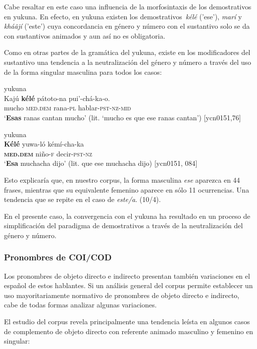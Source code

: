 \documentclass[output=paper]{langscibook}
\begin{document}
Cabe resaltar en este caso una influencia de la morfosintaxis de los demostrativos en yukuna. En efecto, en yukuna existen los demostrativos~\textit{kélé} ('ese'), \textit{marí} y \textit{kháãjí} ('este') cuya concordancia en género y número con el sustantivo solo se da con sustantivos animados y aun así no es obligatoria.

Como en otras partes de la gramática del yukuna, existe en los modificadores del sustantivo una tendencia a la neutralización del género y número a través del uso de la forma singular masculina para todos los casos:

\ea
{yukuna}\\
\gll Kajú  \textbf{kélé}     pátoto-na  pui’-chá-ka-o.\\
     mucho  \textsc{med.dem}  rana-\textsc{pl}  hablar-\textsc{pst-nz-mid}\\
\glt `\textbf{Esas} ranas cantan mucho' (lit. ‘mucho es que ese ranas cantan’) [ycn0151,76]
\z

\ea
{yukuna}\\
\gll \textbf{Kélé}  yuwa-ló   kémí-cha-ka\\
     \textbf{\textsc{med.dem}}  niño-\textsc{f}    decir-\textsc{pst-nz}\\
\glt `\textbf{Esa} muchacha dijo' (lit. que ese muchacha dijo) [ycn0151, 084]
\z

Esto explicaría que, en nuestro corpus, la forma masculina \textit{ese} aparezca en 44 frases, mientras que su equivalente femenino aparece en sólo 11 ocurrencias. Una tendencia que se repite en el caso de \textit{este/a}. (10/4). 

En el presente caso, la convergencia con el yukuna ha resultado en un proceso de simplificación del paradigma de demostrativos a través de la neutralización del género y número.

 \subsubsection{Pronombres de COI/COD}


Los pronombres de objeto directo e indirecto presentan también variaciones en el español de estos hablantes. Si un análisis general del corpus permite establecer un uso mayoritariamente normativo de pronombres de objeto directo e indirecto, cabe de todas formas analizar algunas variaciones. 

El estudio del corpus revela principalmente una tendencia leísta en algunos casos de complemento de objeto directo con referente animado masculino y femenino en singular: 
\end{document}
